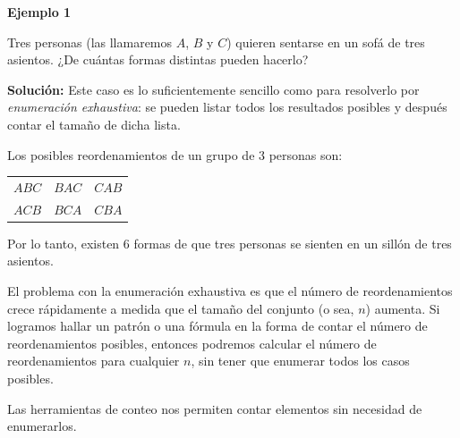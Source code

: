 \documentclass[
  letterpaper,
  DIV=11,
  numbers=noendperiod]{scrreprt}
\begin{document}
\begin{examplebox}

\begin{center}
\textbf{Ejemplo 1}

\end{center}

Tres personas (las llamaremos \(A\), \(B\) y \(C\)) quieren sentarse en
un sofá de tres asientos. ¿De cuántas formas distintas pueden hacerlo?

\textbf{Solución:} Este caso es lo suficientemente sencillo como para
resolverlo por \emph{enumeración exhaustiva}: se pueden listar todos los
resultados posibles y después contar el tamaño de dicha lista.

Los posibles reordenamientos de un grupo de 3 personas son:

\begin{flexcenter}

\begin{half}

\begin{longtable}[]{@{}lll@{}}
\toprule\noalign{}
\endhead
\bottomrule\noalign{}
\endlastfoot
\(ABC\) & \(BAC\) & \(CAB\) \\
\(ACB\) & \(BCA\) & \(CBA\) \\
\end{longtable}

\end{half}

\end{flexcenter}

Por lo tanto, existen 6 formas de que tres personas se sienten en un
sillón de tres asientos.

\end{examplebox}

El problema con la enumeración exhaustiva es que el número de
reordenamientos crece rápidamente a medida que el tamaño del conjunto (o
sea, \(n\)) aumenta. Si logramos hallar un patrón o una fórmula en la
forma de contar el número de reordenamientos posibles, entonces podremos
calcular el número de reordenamientos para cualquier \(n\), sin tener
que enumerar todos los casos posibles.

\begin{tcolorbox}[enhanced jigsaw, opacitybacktitle=0.6, breakable, toptitle=1mm, toprule=.15mm, colback=white, coltitle=black, leftrule=.75mm, colframe=quarto-callout-tip-color-frame, left=2mm, opacityback=0, bottomrule=.15mm, arc=.35mm, colbacktitle=quarto-callout-tip-color!10!white, bottomtitle=1mm, titlerule=0mm, title=\textcolor{quarto-callout-tip-color}{\faLightbulb}\hspace{0.5em}{Idea clave}, rightrule=.15mm]

Las herramientas de conteo nos permiten contar elementos sin necesidad
de enumerarlos.

\end{tcolorbox}
\end{document}

